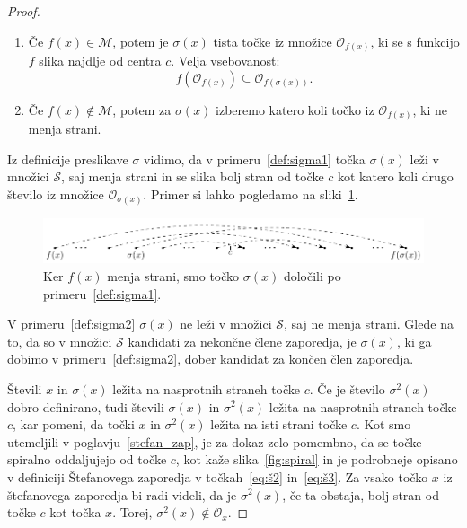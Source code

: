 \documentclass[mat2]{fmfdelo}
\begin{document}
\begin{proof}
\begin{enumerate}[label={(\arabic*)}]
\item\label{def:sigma1} Če $f(x) \in \mathcal{M}$, potem je $\sigma(x)$ tista točke iz množice $\mathcal{O}_{f(x)}$, ki se s funkcijo $f$ slika najdlje od centra $c$. Velja vsebovanost:
$$f(\mathcal{O}_{f(x)}) \subseteq \mathcal{O}_{f(\sigma(x))}.$$
\item\label{def:sigma2} Če $f(x) \notin \mathcal{M}$, potem za $\sigma(x)$ izberemo katero koli točko iz $\mathcal{O}_{f(x)}$, ki ne menja strani.
\end{enumerate}
Iz definicije preslikave $\sigma$ vidimo, da v primeru~\ref{def:sigma1} točka $\sigma(x)$ leži v množici $\mathcal{S}$, saj menja strani in se slika bolj stran od točke $c$ kot katero koli drugo število iz množice $\mathcal{O}_{\sigma(x)}$. Primer si lahko pogledamo na sliki~\ref{fig:sigma}.
\begin{figure}[h]
  \centering
  \includegraphics{images/sigma.pdf}
  \caption{Ker $f(x)$ menja strani, smo točko $\sigma(x)$ določili po primeru~\ref{def:sigma1}.}
  \label{fig:sigma}
\end{figure}

V primeru~\ref{def:sigma2} $\sigma(x)$ ne leži v množici $\mathcal{S}$, saj ne menja strani. Glede na to, da so v množici $\mathcal{S}$ kandidati za nekončne člene zaporedja, je $\sigma(x)$, ki ga dobimo v primeru~\ref{def:sigma2}, dober kandidat za končen člen zaporedja.

Števili $x$ in $\sigma(x)$ ležita na nasprotnih straneh točke $c$. Če je število $\sigma^2(x)$ dobro definirano, tudi števili $\sigma(x)$ in $\sigma^2(x)$ ležita na nasprotnih straneh točke $c$, kar pomeni, da točki $x$ in $\sigma^2(x)$ ležita na isti strani točke $c$. Kot smo utemeljili v poglavju~\ref{stefan_zap}, je za dokaz zelo pomembno, da se točke spiralno oddaljujejo od točke $c$, kot kaže slika~\ref{fig:spiral} in je podrobneje opisano v definiciji Štefanovega zaporedja v točkah~\ref{eq:š2} in~\ref{eq:š3}. Za vsako točko $x$ iz štefanovega zaporedja bi radi videli, da je $\sigma^2(x)$, če ta obstaja, bolj stran od točke $c$ kot točka $x$. Torej, $\sigma^2(x) \notin \mathcal{O}_x$.



\end{proof}
\end{document}
